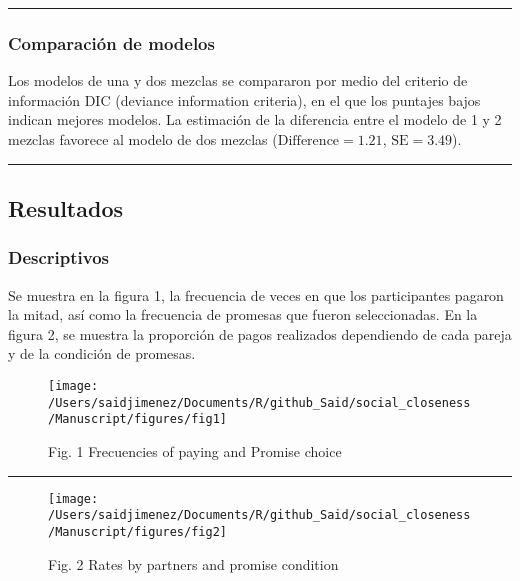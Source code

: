 \documentclass[12pt,]{article}
\begin{document}
\begin{center}\rule{0.5\linewidth}{\linethickness}\end{center}

\subsubsection{Comparación de modelos}\label{comparacion-de-modelos}

Los modelos de una y dos mezclas se compararon por medio del criterio de
información DIC (deviance information criteria), en el que los puntajes
bajos indican mejores modelos. La estimación de la diferencia entre el
modelo de 1 y 2 mezclas favorece al modelo de dos mezclas
(\(\mathrm{Difference}= 1.21\), \(\mathrm{SE}= 3.49\)).

\begin{center}\rule{0.5\linewidth}{\linethickness}\end{center}

\subsection{Resultados}\label{resultados}

\subsubsection{Descriptivos}\label{descriptivos}

Se muestra en la figura 1, la frecuencia de veces en que los
participantes pagaron la mitad, así como la frecuencia de promesas que
fueron seleccionadas. En la figura 2, se muestra la proporción de pagos
realizados dependiendo de cada pareja y de la condición de promesas.

\begin{figure}

{\centering \texttt{[image: /Users/saidjimenez/Documents/R/github\_Said/social\_closeness/Manuscript/figures/fig1]} 

}

\caption{Fig. 1 Frecuencies of paying and Promise choice}\label{fig:fig1}
\end{figure}

\begin{center}\rule{0.5\linewidth}{\linethickness}\end{center}

\begin{figure}

{\centering \texttt{[image: /Users/saidjimenez/Documents/R/github\_Said/social\_closeness/Manuscript/figures/fig2]} 

}

\caption{Fig. 2 Rates by partners and promise condition}\label{fig:fig2}
\end{figure}
\end{document}
